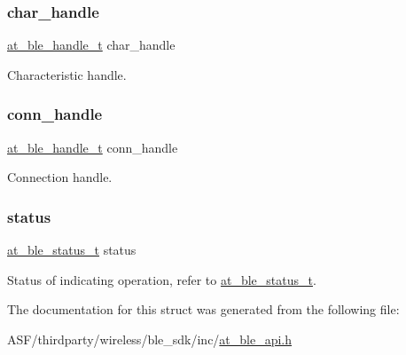 \subsubsection{\texorpdfstring{char\_handle}{char\_handle}}
{\footnotesize\ttfamily \mbox{\hyperlink{at__ble__api_8h_abd23646d0c662860741f787efc8456f2}{at\+\_\+ble\+\_\+handle\+\_\+t}} char\+\_\+handle}



Characteristic handle. 

\mbox{\label{structat__ble__indication__confirmed__t_ae42df6fd8493f8f8faeccfdd6062e96f}} 
\subsubsection{\texorpdfstring{conn\_handle}{conn\_handle}}
{\footnotesize\ttfamily \mbox{\hyperlink{at__ble__api_8h_abd23646d0c662860741f787efc8456f2}{at\+\_\+ble\+\_\+handle\+\_\+t}} conn\+\_\+handle}



Connection handle. 

\mbox{\label{structat__ble__indication__confirmed__t_a0b48093fc2030779fc47e5216f8019e2}} 
\subsubsection{\texorpdfstring{status}{status}}
{\footnotesize\ttfamily \mbox{\hyperlink{group__error__codes__group_ga3b1db9b95feb157b3c188ca27fe76988}{at\+\_\+ble\+\_\+status\+\_\+t}} status}



Status of indicating operation, refer to \mbox{\hyperlink{at__ble__api_8h_ace24eb4e5ca3f325c663b809da5feb92}{at\+\_\+ble\+\_\+status\+\_\+t}}. 



The documentation for this struct was generated from the following file\+:\begin{DoxyCompactItemize}
\item 
A\+S\+F/thirdparty/wireless/ble\+\_\+sdk/inc/\mbox{\hyperlink{at__ble__api_8h}{at\+\_\+ble\+\_\+api.\+h}}\end{DoxyCompactItemize}
